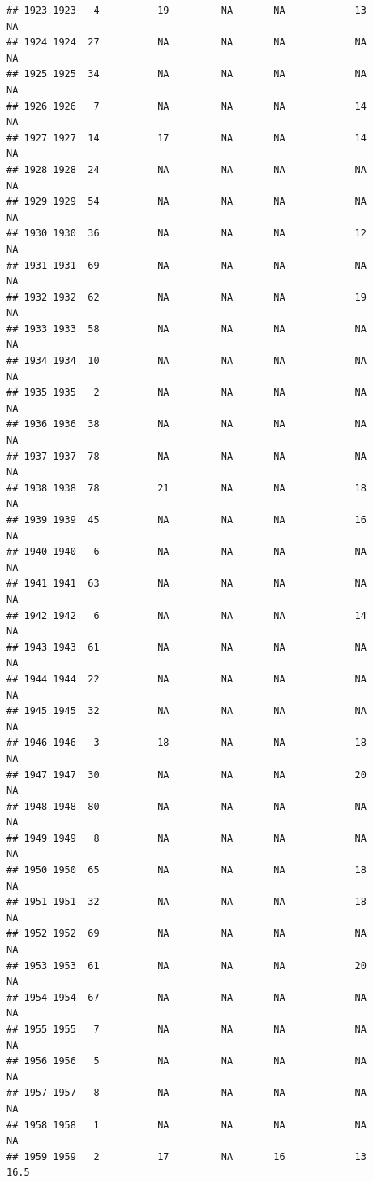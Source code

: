 \documentclass[man]{apa6}
\begin{document}
\begin{verbatim}
## 1923 1923   4          19         NA       NA            13       NA
## 1924 1924  27          NA         NA       NA            NA       NA
## 1925 1925  34          NA         NA       NA            NA       NA
## 1926 1926   7          NA         NA       NA            14       NA
## 1927 1927  14          17         NA       NA            14       NA
## 1928 1928  24          NA         NA       NA            NA       NA
## 1929 1929  54          NA         NA       NA            NA       NA
## 1930 1930  36          NA         NA       NA            12       NA
## 1931 1931  69          NA         NA       NA            NA       NA
## 1932 1932  62          NA         NA       NA            19       NA
## 1933 1933  58          NA         NA       NA            NA       NA
## 1934 1934  10          NA         NA       NA            NA       NA
## 1935 1935   2          NA         NA       NA            NA       NA
## 1936 1936  38          NA         NA       NA            NA       NA
## 1937 1937  78          NA         NA       NA            NA       NA
## 1938 1938  78          21         NA       NA            18       NA
## 1939 1939  45          NA         NA       NA            16       NA
## 1940 1940   6          NA         NA       NA            NA       NA
## 1941 1941  63          NA         NA       NA            NA       NA
## 1942 1942   6          NA         NA       NA            14       NA
## 1943 1943  61          NA         NA       NA            NA       NA
## 1944 1944  22          NA         NA       NA            NA       NA
## 1945 1945  32          NA         NA       NA            NA       NA
## 1946 1946   3          18         NA       NA            18       NA
## 1947 1947  30          NA         NA       NA            20       NA
## 1948 1948  80          NA         NA       NA            NA       NA
## 1949 1949   8          NA         NA       NA            NA       NA
## 1950 1950  65          NA         NA       NA            18       NA
## 1951 1951  32          NA         NA       NA            18       NA
## 1952 1952  69          NA         NA       NA            NA       NA
## 1953 1953  61          NA         NA       NA            20       NA
## 1954 1954  67          NA         NA       NA            NA       NA
## 1955 1955   7          NA         NA       NA            NA       NA
## 1956 1956   5          NA         NA       NA            NA       NA
## 1957 1957   8          NA         NA       NA            NA       NA
## 1958 1958   1          NA         NA       NA            NA       NA
## 1959 1959   2          17         NA       16            13     16.5

\end{verbatim}
\end{document}
